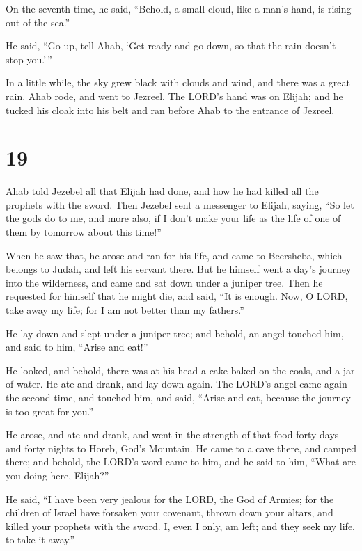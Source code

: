  On the seventh time, he said, ``Behold, a small cloud,
like a man's hand, is rising out of the sea.''

He said, ``Go up, tell Ahab, `Get ready and go down, so that the rain
doesn't stop you.'\,''

 In a little while, the sky grew black with clouds and
wind, and there was a great rain. Ahab rode, and went to Jezreel.
 The LORD's hand was on Elijah; and he tucked his cloak
into his belt and ran before Ahab to the entrance of Jezreel.

\hypertarget{section-18}{%
\section{19}\label{section-18}}

 Ahab told Jezebel all that Elijah had done, and how he had
killed all the prophets with the sword.  Then Jezebel sent a
messenger to Elijah, saying, ``So let the gods do to me, and more also,
if I don't make your life as the life of one of them by tomorrow about
this time!''

 When he saw that, he arose and ran for his life, and came
to Beersheba, which belongs to Judah, and left his servant there.
 But he himself went a day's journey into the wilderness,
and came and sat down under a juniper tree. Then he requested for
himself that he might die, and said, ``It is enough. Now, O LORD, take
away my life; for I am not better than my fathers.''

 He lay down and slept under a juniper tree; and behold, an
angel touched him, and said to him, ``Arise and eat!''

 He looked, and behold, there was at his head a cake baked
on the coals, and a jar of water. He ate and drank, and lay down again.
 The LORD's angel came again the second time, and touched
him, and said, ``Arise and eat, because the journey is too great for
you.''

 He arose, and ate and drank, and went in the strength of
that food forty days and forty nights to Horeb, God's Mountain.
 He came to a cave there, and camped there; and behold, the
LORD's word came to him, and he said to him, ``What are you doing here,
Elijah?''

 He said, ``I have been very jealous for the LORD, the God
of Armies; for the children of Israel have forsaken your covenant,
thrown down your altars, and killed your prophets with the sword. I,
even I only, am left; and they seek my life, to take it away.''

